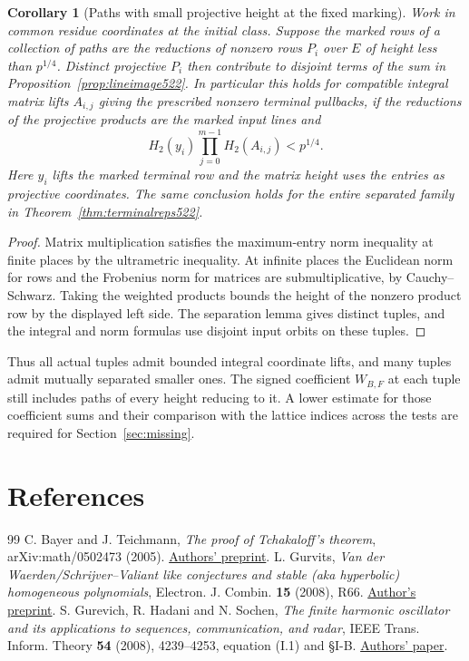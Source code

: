 \documentclass[a4paper,11pt]{article}
\newtheorem{corollary}[proposition]{Corollary}
\theoremstyle{definition}
\theoremstyle{remark}
\numberwithin{equation}{section}
\begin{document}
\begin{corollary}[Paths with small projective height at the fixed marking]
\leavevmode\label{cor:markedheight522}
Work in common residue coordinates at the initial class. Suppose the
marked rows of a collection of paths are the reductions of nonzero
rows \(P_i\) over \(E\) of height less than \(p^{1/4}\). Distinct
projective \(P_i\) then contribute to disjoint terms of the sum in
Proposition~\ref{prop:lineimage522}. In particular this holds for
compatible integral matrix lifts \(A_{i,j}\) giving the prescribed
nonzero terminal pullbacks, if the reductions of the projective
products are the marked input lines and
\[
                H_2(y_i)\prod_{j=0}^{m-1} H_2(A_{i,j})<p^{1/4}.
\]
Here \(y_i\) lifts the marked terminal row and the matrix height uses
the entries as projective coordinates. The same conclusion holds for
the entire separated family in Theorem~\ref{thm:terminalreps522}.
\end{corollary}
\begin{proof}
Matrix multiplication satisfies the maximum-entry norm inequality
at finite places by the ultrametric inequality. At infinite places
the Euclidean norm for rows and the Frobenius norm for matrices are
submultiplicative, by Cauchy--Schwarz. Taking the weighted products
bounds the height of the nonzero product row by the displayed left
side. The separation lemma gives distinct tuples, and the integral
and norm formulas use disjoint input orbits on these tuples.
\end{proof}

Thus all actual tuples admit bounded integral coordinate lifts, and
many tuples admit mutually separated smaller ones. The signed
coefficient \(W_{B,F}\) at each tuple still includes paths of every
height reducing to it. A lower estimate for those coefficient sums
and their comparison with the lattice indices across the tests are
required for Section~\ref{sec:missing}.

\clearpage
\section{References}\label{nav:bibliography-XXVII}
\begingroup{}\begin{thebibliography}{99}\small
{} C. Bayer and J. Teichmann, \emph{The proof of Tchakaloff's theorem}, arXiv:math/0502473 (2005). \href{https://arxiv.org/abs/math/0502473}{Authors' preprint}.
 L. Gurvits, \emph{Van der Waerden/Schrijver--Valiant like conjectures and stable (aka hyperbolic) homogeneous polynomials}, Electron. J. Combin. \textbf{15} (2008), R66. \href{https://arxiv.org/abs/0711.3496}{Author's preprint}.
 S. Gurevich, R. Hadani and N. Sochen, \emph{The finite harmonic oscillator and its applications to sequences, communication, and radar}, IEEE Trans. Inform. Theory \textbf{54} (2008), 4239--4253, equation (I.1) and \S I-B. \href{https://people.math.wisc.edu/~sgurevich/IEEE-Journal.pdf}{Authors' paper}.
\end{thebibliography}\endgroup
\end{document}
